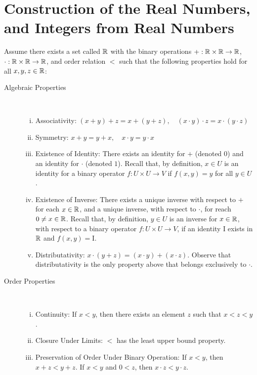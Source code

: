 \section{Construction of the Real Numbers, and Integers from Real Numbers} 
\begin{definition}
	Assume there exists a set called $\mathbb{R}$ with the binary operations $+: \mathbb{R} \times
	\mathbb{R} \to \mathbb{R}$, $\cdot: \mathbb{R} \times \mathbb{R} \to \mathbb{R}$, and order relation $<$
	such that the following properties hold for all $x,y,z \in \mathbb{R}$:
	\begin{description}
		\item[Algebraic Properties]\
			\begin{enumerate}[(i)]
				\item{Associativity:} $(x + y) + z = x + (y+z), \quad (x \cdot y) \cdot z = x
					\cdot (y \cdot z)$
				\item{Symmetry:} $x + y = y + x, \quad x \cdot y = y \cdot x$
				\item{Existence of Identity:} There exists an identity for $+$ (denoted $0$) and
					an identity for $\cdot$ (denoted $1$). Recall that, by definition, $x \in U$
					is an identity for a binary operator $f: U\times U \to V$ if $f(x,y) = y$ for
					all $y \in U$.
				\item{Existence of Inverse:} There exists a unique inverse
					with respect to $+$ for each $x \in \mathbb{R}$, and a unique inverse, with respect
					to $\cdot$, for reach $0 \neq x \in \mathbb{R}$. Recall that, by definition,
					$y \in U$ is an inverse for $x \in \mathbb{R}$, with respect to a binary operator $f:
					U \times U \to V$, if an identity I exists in $\mathbb{R}$ and $f(x,y) = \mathrm{I}$.  
				\item{Distributativity:} $x \cdot (y+z) = (x \cdot y) + (x \cdot z)$.
					Observe that distributativity is the only property above that belongs
					exclusively to $\cdot$.
			\end{enumerate}
		\item[Order Properties]\
			\begin{enumerate}[(vi)]
				\item{Continuity:}
					If $x<y$, then there exists an element $z$ such that $x <z < y$.
				\item{Closure Under Limits:} $<$ has the least upper bound property.
				\item{Preservation of Order Under Binary Operation:} If $x < y$, then $x + z < y
					+ z$. If $x < y$ and $0 < z$, then $x \cdot z < y \cdot z$.
			\end{enumerate}
	\end{description}
\end{definition}

